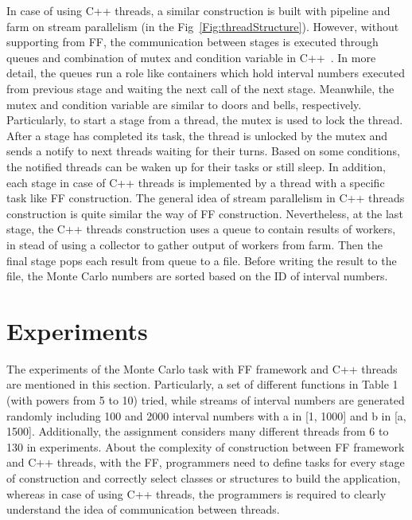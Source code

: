 \documentclass[runningheads,a4paper]{llncs}
\begin{document}
In case of using C++ threads, a similar construction is built with pipeline and farm on stream
parallelism (in the Fig~\ref{Fig:threadStructure}). 
However, without supporting from FF, the communication between
stages is executed through queues and combination of mutex and condition variable in C++~\cite{thread}.
In more detail, the queues run a role like containers which hold interval numbers executed
from previous stage and waiting the next call of the next stage. Meanwhile, the mutex and
condition variable are similar to doors and bells, respectively. Particularly, to start a stage
from a thread, the mutex is used to lock the thread. After a stage has completed its task, the
thread is unlocked by the mutex and sends a notify to next threads waiting for their turns.
Based on some conditions, the notified threads can be waken up for their tasks or still sleep.
In addition, each stage in case of C++ threads is implemented by a thread with a specific task
like FF construction. The general idea of stream parallelism in C++ threads construction is
quite similar the way of FF construction. Nevertheless, at the last stage, the C++ threads
construction uses a queue to contain results of workers, in stead of using a collector to gather
output of workers from farm. Then the final stage pops each result from queue to a file. Before
writing the result to the file, the Monte Carlo numbers are sorted based on the ID of interval
numbers.





\section{Experiments}
\label{sec:exper}
The experiments of the Monte Carlo task with FF framework and C++ threads are mentioned
in this section. Particularly, a set of different functions in Table 1 (with powers from 5 to 10) tried, while streams of interval numbers are generated randomly including 100 and 2000
interval numbers with a in [1, 1000] and b in [a, 1500]. Additionally, the assignment considers
many different threads from 6 to 130 in experiments. About the complexity
of construction between FF framework and C++ threads, with the FF, programmers need to
define tasks for every stage of construction and correctly select classes or structures to build the
application, whereas in case of using C++ threads, the programmers is required to clearly
understand the idea of communication between threads.
\end{document}
